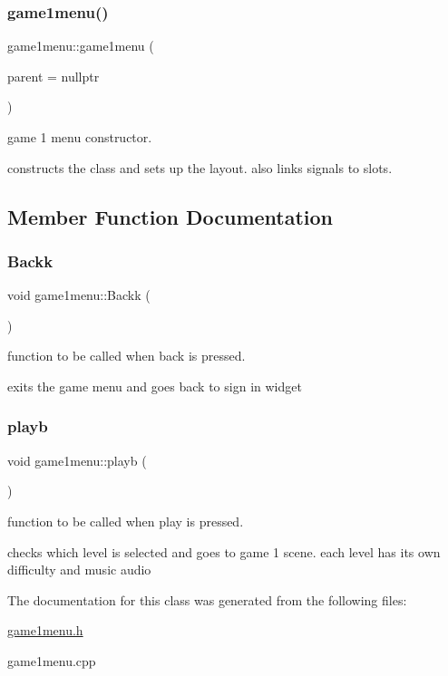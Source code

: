 \subsubsection{\texorpdfstring{game1menu()}{game1menu()}}
{\footnotesize\ttfamily game1menu\+::game1menu (\begin{DoxyParamCaption}\item[{Q\+Widget $\ast$}]{parent = {\ttfamily nullptr} }\end{DoxyParamCaption})\hspace{0.3cm}{\ttfamily [explicit]}}



game 1 menu constructor. 

constructs the class and sets up the layout. also links signals to slots. 

\subsection{Member Function Documentation}
\mbox{\label{classgame1menu_aacd43f1621af0ac39370c5f1b16868fa}} 
\subsubsection{\texorpdfstring{Backk}{Backk}}
{\footnotesize\ttfamily void game1menu\+::\+Backk (\begin{DoxyParamCaption}{ }\end{DoxyParamCaption})\hspace{0.3cm}{\ttfamily [slot]}}



function to be called when back is pressed. 

exits the game menu and goes back to sign in widget \mbox{\label{classgame1menu_a52cfac581c4ec8dee4b2790b773014c7}} 
\subsubsection{\texorpdfstring{playb}{playb}}
{\footnotesize\ttfamily void game1menu\+::playb (\begin{DoxyParamCaption}{ }\end{DoxyParamCaption})\hspace{0.3cm}{\ttfamily [slot]}}



function to be called when play is pressed. 

checks which level is selected and goes to game 1 scene. each level has it\textquotesingle{}s own difficulty and music audio 

The documentation for this class was generated from the following files\+:\begin{DoxyCompactItemize}
\item 
\hyperlink{game1menu_8h}{game1menu.\+h}\item 
game1menu.\+cpp\end{DoxyCompactItemize}
